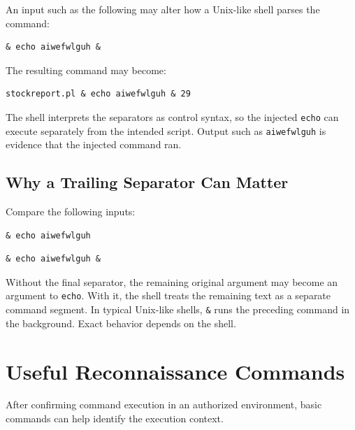 \documentclass[12pt,a4paper]{article}
\newcommand{\nsection}[1]{\section{#1}}
\newcommand{\nsubsection}[1]{\subsection{#1}}
\begin{document}
An input such as the following may alter how a Unix-like shell
parses the command:

\begin{lstlisting}
& echo aiwefwlguh &
\end{lstlisting}

The resulting command may become:

\begin{lstlisting}
stockreport.pl & echo aiwefwlguh & 29
\end{lstlisting}

The shell interprets the separators as control syntax, so the
injected \texttt{echo} can execute separately from the intended
script. Output such as \texttt{aiwefwlguh} is evidence that the
injected command ran.

\vspace{0.5cm}
\nsubsection{Why a Trailing Separator Can Matter}

Compare the following inputs:

\begin{lstlisting}
& echo aiwefwlguh
\end{lstlisting}

\begin{lstlisting}
& echo aiwefwlguh &
\end{lstlisting}

Without the final separator, the remaining original argument
may become an argument to \texttt{echo}. With it, the shell
treats the remaining text as a separate command segment.
In typical Unix-like shells, \texttt{\&} runs the preceding
command in the background. Exact behavior depends on the shell.

\newpage
\nsection{Useful Reconnaissance Commands}

\vspace{0.3cm}

After confirming command execution in an authorized environment,
basic commands can help identify the execution context.

\vspace{0.3cm}
\end{document}
